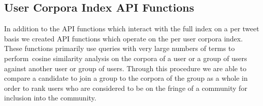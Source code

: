 \subsection{User Corpora Index API Functions}
In addition to the API functions which interact with the full index on a per tweet basis we created API functions which operate on the per user corpora index.  These functions primarily use queries with very large numbers of terms to perform cosine similarity analysis on the corpora of a user or a group of users against another user or group of users.  Through this procedure we are able to compare a candidate to join a group to the corpora of the group as a whole in order to rank users who are considered to be on the fringe of a community for inclusion into the community.
